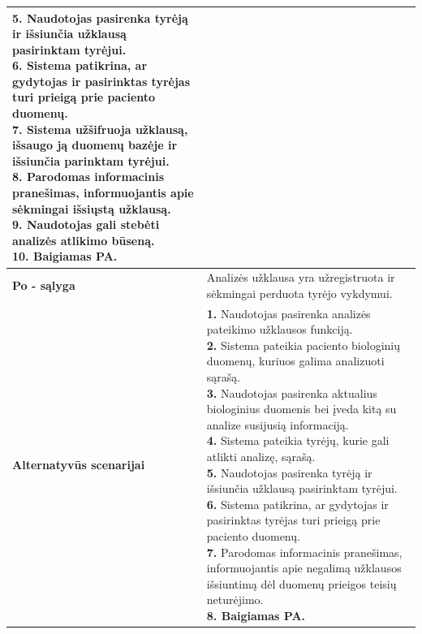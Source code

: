 \documentclass[12pt]{article}
\begin{document}
\begin{table}[htb!]
\begin{tabular}{|m{3cm}|m{13.7cm}|}
{{            \textbf{5.} \textcolor{dartmouthgreen}{Naudotojas pasirenka tyrėją ir
            išsiunčia užklausą pasirinktam tyrėjui.} \\
            \textbf{6.} {Sistema patikrina, ar gydytojas
            ir pasirinktas tyrėjas turi prieigą prie paciento duomenų.} \\
            \textbf{7.} {Sistema užšifruoja užklausą,
            išsaugo ją duomenų bazėje ir išsiunčia parinktam tyrėjui.} \\
            \textbf{8.} {Parodomas informacinis
            pranešimas, informuojantis apie sėkmingai išsiųstą užklausą.} \\
            \textbf{9.} \textcolor{dartmouthgreen}{Naudotojas gali stebėti
            analizės atlikimo būseną.} \\
            \textbf{10. Baigiamas PA.}
        }}
        \\
        \hline
        \raggedleft \textbf{\cellcolor{deepchampagne}Po - sąlyga} &
        Analizės užklausa yra užregistruota ir sėkmingai perduota tyrėjo
        vykdymui. \\
        \hline
        \raggedleft \textbf{\cellcolor{deepchampagne}Alternatyvūs scenarijai} &
        \vskip 5pt
        \makecell[l]{\parbox[t]{13.7cm}{
            \textbf{1.} \textcolor{dartmouthgreen}{Naudotojas pasirenka analizės
            pateikimo užklausos funkciją.} \\
            \textbf{2.} {Sistema pateikia paciento
            biologinių duomenų, kuriuos galima analizuoti sąrašą.} \\
            \textbf{3.} \textcolor{dartmouthgreen}{Naudotojas pasirenka
            aktualius biologinius duomenis bei įveda kitą su analize susijusią
            informaciją.} \\
            \textbf{4.} {Sistema pateikia tyrėjų, kurie
            gali atlikti analizę, sąrašą.} \\
            \textbf{5.} \textcolor{dartmouthgreen}{Naudotojas pasirenka tyrėją
            ir išsiunčia užklausą pasirinktam tyrėjui.} \\
            \textbf{6.} {Sistema patikrina, ar gydytojas
            ir pasirinktas tyrėjas turi prieigą prie paciento duomenų.} \\
            \textbf{7.} {Parodomas informacinis
            pranešimas, informuojantis apie negalimą užklausos išsiuntimą dėl
            duomenų prieigos teisių neturėjimo.} \\
            \textbf{8. Baigiamas PA.}
        }}
        \\
        \hline
    \end{tabular}
\end{table}
\end{document}
